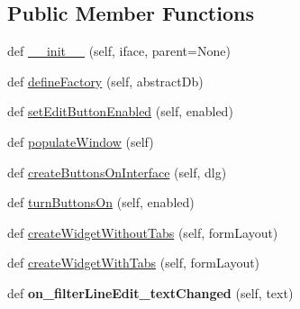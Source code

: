 \subsection*{Public Member Functions}
\begin{DoxyCompactItemize}
\item 
def \mbox{\hyperlink{class_dsg_tools_1_1_production_tools_1_1_field_tool_box_1_1field__toolbox_1_1_field_toolbox_a6b312f2aa592e24d41390e4ed5f21b01}{\+\_\+\+\_\+init\+\_\+\+\_\+}} (self, iface, parent=None)
\item 
def \mbox{\hyperlink{class_dsg_tools_1_1_production_tools_1_1_field_tool_box_1_1field__toolbox_1_1_field_toolbox_a6c2f8a2403ed6d0283fba1c7b5e1a602}{define\+Factory}} (self, abstract\+Db)
\item 
def \mbox{\hyperlink{class_dsg_tools_1_1_production_tools_1_1_field_tool_box_1_1field__toolbox_1_1_field_toolbox_a84e0b371a8fd1346e789c0a25bda6716}{set\+Edit\+Button\+Enabled}} (self, enabled)
\item 
def \mbox{\hyperlink{class_dsg_tools_1_1_production_tools_1_1_field_tool_box_1_1field__toolbox_1_1_field_toolbox_a8faeaf01b5665f0b0c37fbc77024ab1c}{populate\+Window}} (self)
\item 
def \mbox{\hyperlink{class_dsg_tools_1_1_production_tools_1_1_field_tool_box_1_1field__toolbox_1_1_field_toolbox_a1d76a17d90eacca8d0ad9eb0582fc43d}{create\+Buttons\+On\+Interface}} (self, dlg)
\item 
def \mbox{\hyperlink{class_dsg_tools_1_1_production_tools_1_1_field_tool_box_1_1field__toolbox_1_1_field_toolbox_af088d3efaf955572f22d8f3ac308a60f}{turn\+Buttons\+On}} (self, enabled)
\item 
def \mbox{\hyperlink{class_dsg_tools_1_1_production_tools_1_1_field_tool_box_1_1field__toolbox_1_1_field_toolbox_ad9cf78f69a8769cb434f93ca2e6f7c23}{create\+Widget\+Without\+Tabs}} (self, form\+Layout)
\item 
def \mbox{\hyperlink{class_dsg_tools_1_1_production_tools_1_1_field_tool_box_1_1field__toolbox_1_1_field_toolbox_a99905e3b42dd4929e874d81615729732}{create\+Widget\+With\+Tabs}} (self, form\+Layout)
\item 
\mbox{\label{class_dsg_tools_1_1_production_tools_1_1_field_tool_box_1_1field__toolbox_1_1_field_toolbox_a82aa647104b3990530f9322ae32f4630}} 
def {\bfseries on\+\_\+filter\+Line\+Edit\+\_\+text\+Changed} (self, text)
\item 

\end{DoxyCompactItemize}
